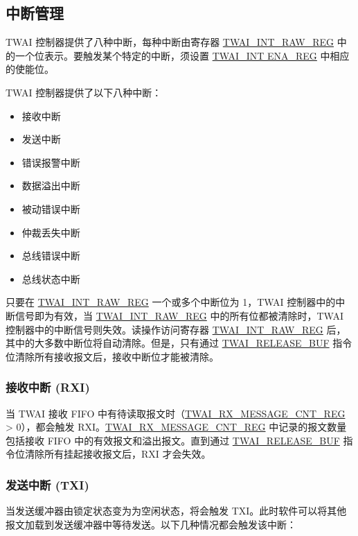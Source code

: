 \documentclass[main\_\_CN.tex]{subfiles}
\begin{document}
\subsection{中断管理}
\label{sec:twai-interrupt-management}
\chipname{} TWAI 控制器提供了八种中断，每种中断由寄存器 \hyperref[regdesc:TWAIINTRAWREG]{TWAI\_INT\_RAW\_REG} 中的一个位表示。要触发某个特定的中断，须设置 \hyperref[regdesc:TWAIINT ENAREG]{TWAI\_INT ENA\_REG} 中相应的使能位。

TWAI 控制器提供了以下八种中断：

\begin{itemize}
    \item 接收中断
    \item 发送中断
    \item 错误报警中断
    \item 数据溢出中断
    \item 被动错误中断
    \item 仲裁丢失中断
    \item 总线错误中断
    \item 总线状态中断
\end{itemize}

只要在 \hyperref[regdesc:TWAIINTRAWREG]{TWAI\_INT\_RAW\_REG} 一个或多个中断位为 1，TWAI 控制器中的中断信号即为有效，当 \hyperref[regdesc:TWAIINTRAWREG]{TWAI\_INT\_RAW\_REG} 中的所有位都被清除时，TWAI 控制器中的中断信号则失效。读操作访问寄存器 \hyperref[regdesc:TWAIINTRAWREG]{TWAI\_INT\_RAW\_REG} 后，其中的大多数中断位将自动清除。但是，只有通过 \hyperref[fielddesc:TWAIRELEASEBUF]{TWAI\_RELEASE\_BUF} 指令位清除所有接收报文后，接收中断位才能被清除。

\subsubsection{接收中断 (RXI)}
当 TWAI 接收 FIFO 中有待读取报文时（\hyperref[regdesc:TWAIRXMESSAGECNTREG]{TWAI\_RX\_MESSAGE\_CNT\_REG} > 0），都会触发 RXI。\hyperref[regdesc:TWAIRXMESSAGECNTREG]{TWAI\_RX\_MESSAGE\_CNT\_REG} 中记录的报文数量包括接收 FIFO 中的有效报文和溢出报文。直到通过 \hyperref[fielddesc:TWAIRELEASEBUF]{TWAI\_RELEASE\_BUF} 指令位清除所有挂起接收报文后，RXI 才会失效。

\subsubsection{发送中断 (TXI)}
当发送缓冲器由锁定状态变为为空闲状态，将会触发 TXI。此时软件可以将其他报文加载到发送缓冲器中等待发送。以下几种情况都会触发该中断： 
\end{document}
